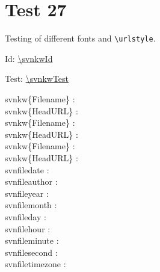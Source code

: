 \documentclass[12pt]{report}
\begin{document}
\raggedright

\chapter{Test 27}
Testing of different fonts and \verb+\urlstyle+.

\noindent
{}

Id: \url{\svnkwId}
\svnkwId

Test: \url{\svnkwTest}
\svnkwTest

 \noindent
 svnkw\{Filename\} :  \\
 svnkw\{HeadURL\}  :  \\
 svnkw\{Filename\} : \texttt{} \\
 svnkw\{HeadURL\}  : \texttt{} \\
 svnkw\{Filename\} : {} \\
 svnkw\{HeadURL\}  : {} \\
 svnfiledate : \svnfiledate  \\
 svnfileauthor : \svnfileauthor  \\
 svnfileyear : \svnfileyear  \\
 svnfilemonth : \svnfilemonth  \\
 svnfileday : \svnfileday  \\
 svnfilehour : \svnfilehour  \\
 svnfileminute : \svnfileminute  \\
 svnfilesecond : \svnfilesecond  \\
 svnfiletimezone : \svnfiletimezone  \\
\end{document}
